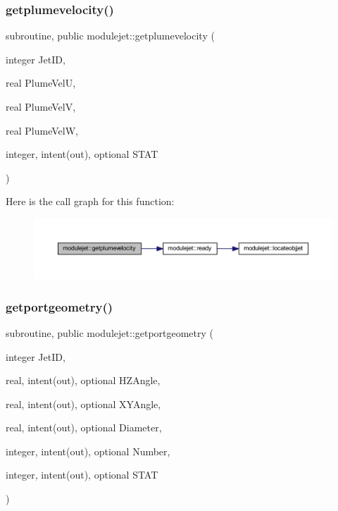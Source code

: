 \subsubsection{\texorpdfstring{getplumevelocity()}{getplumevelocity()}}
{\footnotesize\ttfamily subroutine, public modulejet\+::getplumevelocity (\begin{DoxyParamCaption}\item[{integer}]{Jet\+ID,  }\item[{real}]{Plume\+VelU,  }\item[{real}]{Plume\+VelV,  }\item[{real}]{Plume\+VelW,  }\item[{integer, intent(out), optional}]{S\+T\+AT }\end{DoxyParamCaption})}

Here is the call graph for this function\+:\nopagebreak
\begin{figure}[H]
\begin{center}
\leavevmode
\includegraphics[width=350pt]{namespacemodulejet_ab7e7ab36f584f4edd9e7f7835d1e0cee_cgraph}
\end{center}
\end{figure}
\mbox{\label{namespacemodulejet_adcc462c38759f6ba6caa1b8f33479fa8}} 
\subsubsection{\texorpdfstring{getportgeometry()}{getportgeometry()}}
{\footnotesize\ttfamily subroutine, public modulejet\+::getportgeometry (\begin{DoxyParamCaption}\item[{integer}]{Jet\+ID,  }\item[{real, intent(out), optional}]{H\+Z\+Angle,  }\item[{real, intent(out), optional}]{X\+Y\+Angle,  }\item[{real, intent(out), optional}]{Diameter,  }\item[{integer, intent(out), optional}]{Number,  }\item[{integer, intent(out), optional}]{S\+T\+AT }\end{DoxyParamCaption})}


